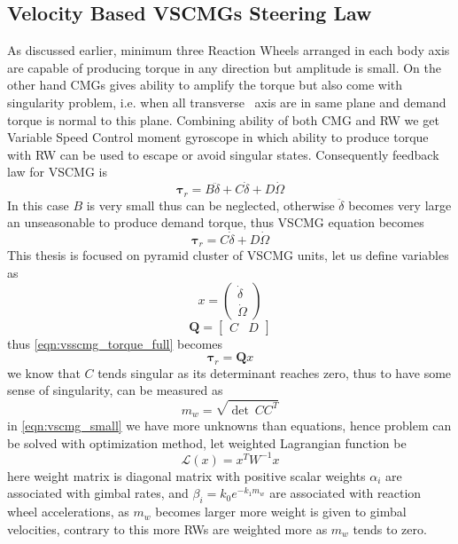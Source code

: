 \subsection{Velocity Based VSCMGs Steering Law}
As discussed earlier, minimum three Reaction Wheels arranged in each body axis are capable of producing torque in any direction but amplitude is small. On the other hand CMGs gives ability to amplify the torque but also come with singularity problem, i.e. when all transverse \ axis are in same plane and demand torque is normal to this plane. Combining ability of both CMG and RW we get Variable Speed Control moment gyroscope in which ability to produce torque with RW can be used to escape or avoid singular states. Consequently feedback law for VSCMG is
\begin{equation}
\mathbf{\tau }_{r} =B\ddot{\delta } +C\dot{\delta } +D\dot{\Omega }
\end{equation}
In this case $\displaystyle B$ is very small thus can be neglected, otherwise $\displaystyle \ddot{\delta }$ becomes very large an unseasonable to produce demand torque, thus VSCMG equation becomes
\begin{equation}
\mathbf{\tau }_{r} =C\dot{\delta } +D\dot{\Omega }
\label{eqn:vsscmg_torque_full}
\end{equation}
This thesis is focused on pyramid cluster of VSCMG units, let us define variables as
\begin{equation}
x=\begin{pmatrix}
\dot{\delta }\\
\dot{\Omega }
\end{pmatrix}
\end{equation}
\begin{equation}
\mathbf{Q} =\begin{bmatrix}
C & D
\end{bmatrix}
\end{equation}
thus \autoref{eqn:vsscmg_torque_full} becomes
\begin{equation}
\mathbf{\tau }_{r} =\mathbf{Q} x
\label{eqn:vscmg_small}
\end{equation}
we know that $\displaystyle C$ tends singular as its determinant reaches zero, thus to have some sense of singularity, can be measured as
\begin{equation}
m_{w} =\sqrt{\det \ CC^{T}} 
\end{equation}
in \autoref{eqn:vscmg_small} we have more unknowns than equations, hence problem can be solved with optimization method, let weighted Lagrangian function be
\begin{equation}
\mathcal{L}( x) =x^{T} W^{-1} x
\end{equation}
here weight matrix is diagonal matrix with positive scalar weights $\displaystyle \alpha _{i}$ are associated with gimbal rates, and $\displaystyle \beta _{i} =k_{0} e^{-k_{1} m_{w}}$ are associated with reaction wheel accelerations, as $\displaystyle m_{w}$ becomes larger more weight is given to gimbal velocities, contrary to this more RWs are weighted more as $\displaystyle m_{w}$ tends to zero.

